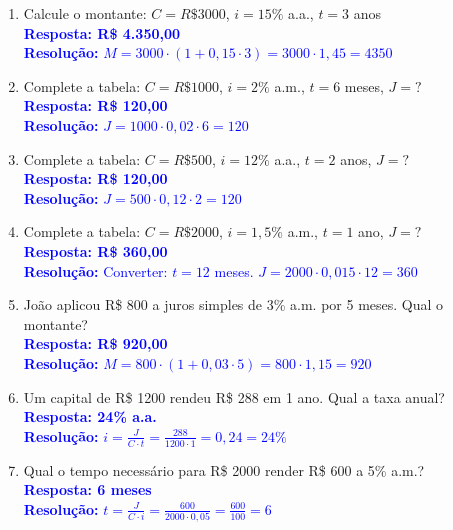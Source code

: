 \documentclass[11pt]{article}
\begin{document}
\begin{multicols}{2}
\begin{enumerate}[leftmargin=*, itemsep=2pt]
\item Calcule o montante: $C = R\$ 3000$, $i = 15\%$ a.a., $t = 3$ anos \\
\textcolor{blue}{\textbf{Resposta: R\$ 4.350,00}} \\
\textcolor{blue}{\textbf{Resolução:} $M = 3000 \cdot (1 + 0,15 \cdot 3) = 3000 \cdot 1,45 = 4350$}

\item Complete a tabela: $C = R\$ 1000$, $i = 2\%$ a.m., $t = 6$ meses, $J = ?$ \\
\textcolor{blue}{\textbf{Resposta: R\$ 120,00}} \\
\textcolor{blue}{\textbf{Resolução:} $J = 1000 \cdot 0,02 \cdot 6 = 120$}

\item Complete a tabela: $C = R\$ 500$, $i = 12\%$ a.a., $t = 2$ anos, $J = ?$ \\
\textcolor{blue}{\textbf{Resposta: R\$ 120,00}} \\
\textcolor{blue}{\textbf{Resolução:} $J = 500 \cdot 0,12 \cdot 2 = 120$}

\item Complete a tabela: $C = R\$ 2000$, $i = 1,5\%$ a.m., $t = 1$ ano, $J = ?$ \\
\textcolor{blue}{\textbf{Resposta: R\$ 360,00}} \\
\textcolor{blue}{\textbf{Resolução:} Converter: $t = 12$ meses. $J = 2000 \cdot 0,015 \cdot 12 = 360$}

\item João aplicou R\$ 800 a juros simples de 3\% a.m. por 5 meses. Qual o montante? \\
\textcolor{blue}{\textbf{Resposta: R\$ 920,00}} \\
\textcolor{blue}{\textbf{Resolução:} $M = 800 \cdot (1 + 0,03 \cdot 5) = 800 \cdot 1,15 = 920$}

\item Um capital de R\$ 1200 rendeu R\$ 288 em 1 ano. Qual a taxa anual? \\
\textcolor{blue}{\textbf{Resposta: 24\% a.a.}} \\
\textcolor{blue}{\textbf{Resolução:} $i = \frac{J}{C \cdot t} = \frac{288}{1200 \cdot 1} = 0,24 = 24\%$}

\item Qual o tempo necessário para R\$ 2000 render R\$ 600 a 5\% a.m.? \\
\textcolor{blue}{\textbf{Resposta: 6 meses}} \\
\textcolor{blue}{\textbf{Resolução:} $t = \frac{J}{C \cdot i} = \frac{600}{2000 \cdot 0,05} = \frac{600}{100} = 6$}


\end{enumerate}
\end{multicols}
\end{document}

